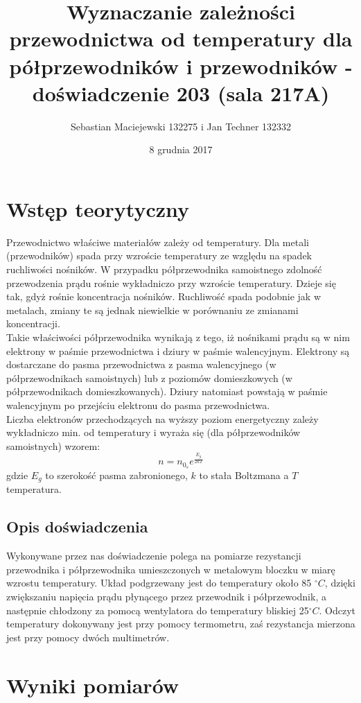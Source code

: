 \documentclass[10pt,a4paper]{article}
\author{Sebastian Maciejewski 132275 i Jan Techner 132332}
\title{Wyznaczanie zależności przewodnictwa od temperatury 
dla półprzewodników i przewodników - \\ doświadczenie 203 (sala 217A)}
\date{8 grudnia 2017}
\newcommand{\forceindent}{\leavevmode{\parindent=3em\indent}}
\begin{document}
\maketitle
\section{Wstęp teorytyczny}
\forceindent Przewodnictwo właściwe materiałów zależy od temperatury. Dla metali (przewodników) spada przy wzroście temperatury ze względu na spadek ruchliwości nośników. W przypadku półprzewodnika samoistnego zdolność przewodzenia prądu rośnie wykładniczo przy wzroście temperatury. Dzieje się tak, gdyż rośnie koncentracja nośników. Ruchliwość spada podobnie jak w metalach, zmiany te są jednak niewielkie w porównaniu ze zmianami koncentracji.\\
Takie właściwości półprzewodnika wynikają z tego, iż nośnikami prądu są w nim elektrony w paśmie przewodnictwa i dziury w paśmie walencyjnym. Elektrony są dostarczane do pasma przewodnictwa z pasma walencyjnego (w półprzewodnikach samoistnych) lub z poziomów domieszkowych (w półprzewodnikach domieszkowanych). Dziury natomiast powstają w paśmie walencyjnym po przejściu elektronu do pasma przewodnictwa.\\
Liczba elektronów przechodzących na wyższy poziom energetyczny zależy wykładniczo min. od temperatury i wyraża się (dla półprzewodników samoistnych) wzorem:
\begin{equation}
n = n_{0_s} e^{\frac{E_g}{2kT}}
\end{equation}
gdzie $E_g$ to szerokość pasma zabronionego, $k$ to stała Boltzmana a $T$ temperatura.

\subsection*{Opis doświadczenia}
\forceindent Wykonywane przez nas doświadczenie polega na pomiarze rezystancji przewodnika i półprzewodnika umieszczonych w metalowym bloczku w miarę wzrostu temperatury. Układ podgrzewany jest do temperatury około 85 $^{\circ}C$, dzięki zwiększaniu napięcia prądu płynącego przez przewodnik i półprzewodnik, a następnie chłodzony za pomocą wentylatora do temperatury bliskiej 25$^{\circ}C$.
Odczyt temperatury dokonywany jest przy pomocy termometru, zaś rezystancja mierzona jest przy pomocy dwóch multimetrów.


\newpage
\section{Wyniki pomiarów}
\end{document}

